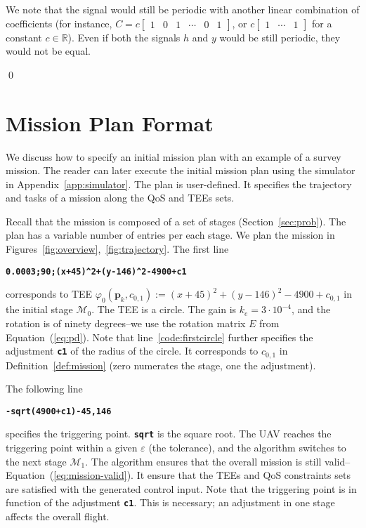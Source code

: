 \documentclass[letterpaper,10pt,conference]{ieeeconf}
\theoremstyle{definition}
\begin{document}
We note that the signal would still be periodic with another linear combination of coefficients (for instance, $C=c\begin{bmatrix}1 & 0 & 1 & \cdots & 0 & 1\end{bmatrix}$, or $c\begin{bmatrix}1 & \cdots & 1\end{bmatrix}$ for a constant $c\in\mathbb{R}$). Even if both the signals $h$ and $y$ would be still periodic, they would not be equal.

\qed

\section{Mission Plan Format}

We discuss how to specify an initial mission plan with an example of a survey mission. The reader can later execute the initial mission plan using the simulator in Appendix~\ref{app:simulator}. The plan is user-defined. It specifies the trajectory and tasks of a mission along the QoS and TEEs sets. 

Recall that the mission is composed of a set of stages (Section~\ref{sec:prob}). The plan has a variable number of entries per each stage. We plan the mission in Figures~\ref{fig:overview},~\ref{fig:trajectory}. The first line
\begin{algorithmic}[1]
  \State\textbf{\texttt{0.0003;90;(x+45)\^{}2+(y-146)\^{}2-4900+c1}}\label{code:firstcircle}
\end{algorithmic}
corresponds to TEE $\varphi_0(\mathbf{p}_k,c_{0,1}):=(x+45)^2+(y-146)^2-4900+c_{0,1}$ in the initial stage $\mathcal{M}_0$. The TEE is a circle. The gain is $k_e=3\cdot 10^{-4}$, and the rotation is of ninety degrees--we use the rotation matrix $E$ from Equation~(\ref{eq:pd}). Note that line~\ref{code:firstcircle} further specifies the adjustment {\tt\textbf{c1}} of the radius of the circle. It corresponds to $c_{0,1}$ in Definition~\ref{def:mission} (zero numerates the stage, one the adjustment).

The following line
\begin{algorithmic}[1]
  \State\textbf{\texttt{-sqrt(4900+c1)-45,146}}\label{code:trigger}
\end{algorithmic}
specifies the triggering point. {\tt\textbf{sqrt}} is the square root. The UAV reaches the triggering point within a given $\varepsilon$ (the tolerance), and the algorithm switches to the next stage $\mathcal{M}_1$. The algorithm ensures that the overall mission is still valid--Equation~(\ref{eq:mission-valid}). It ensure that the TEEs and QoS constraints sets are satisfied with the generated control input. Note that the triggering point is in function of the adjustment {\tt\textbf{c1}}. This is necessary; an adjustment in one stage affects the overall flight.
\end{document}
